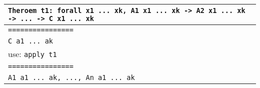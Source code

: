 \documentclass[10pt,landscape]{article}
\begin{document}
\begin{multicols}{3}
{\begin{tabular}{|p{6.2cm}|}\hline
{\tt Theroem t1: forall x1 ... xk, A1 x1 ... xk -> A2 x1 ... xk -> ... ->
  C x1 ... xk }\\ \hline
{\tt ================}\\
{\tt C a1 ... ak}\\ \hline
use: {\tt apply t1}\\ \hline
{\tt ================}\\
{\tt A1 a1 ... ak, ..., An a1 ... ak}\\ \hline
\end{tabular}
}

\end{multicols}

\newpage


\end{document}
